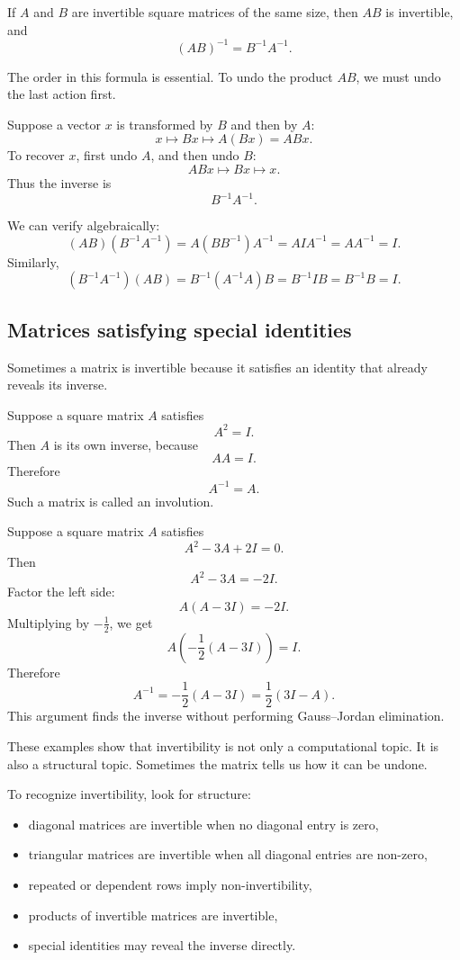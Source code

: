 \begin{theorembox}
If \(A\) and \(B\) are invertible square matrices of the same size, then \(AB\) is invertible, and
\[
(AB)^{-1}=B^{-1}A^{-1}.
\]
\end{theorembox}

The order in this formula is essential. To undo the product \(AB\), we must undo the last action first.

Suppose a vector \(x\) is transformed by \(B\) and then by \(A\):
\[
x \longmapsto Bx \longmapsto A(Bx)=ABx.
\]
To recover \(x\), first undo \(A\), and then undo \(B\):
\[
ABx \longmapsto Bx \longmapsto x.
\]
Thus the inverse is
\[
B^{-1}A^{-1}.
\]

We can verify algebraically:
\[
(AB)(B^{-1}A^{-1})=A(BB^{-1})A^{-1}=AI A^{-1}=AA^{-1}=I.
\]
Similarly,
\[
(B^{-1}A^{-1})(AB)=B^{-1}(A^{-1}A)B=B^{-1}IB=B^{-1}B=I.
\]

\subsection{Matrices satisfying special identities}

Sometimes a matrix is invertible because it satisfies an identity that already reveals its inverse.

\begin{examplebox}
Suppose a square matrix \(A\) satisfies
\[
A^2=I.
\]
Then \(A\) is its own inverse, because
\[
AA=I.
\]
Therefore
\[
A^{-1}=A.
\]
Such a matrix is called an involution.
\end{examplebox}

\begin{examplebox}
Suppose a square matrix \(A\) satisfies
\[
A^2-3A+2I=0.
\]
Then
\[
A^2-3A=-2I.
\]
Factor the left side:
\[
A(A-3I)=-2I.
\]
Multiplying by \(-\frac12\), we get
\[
A\left(-\frac12(A-3I)\right)=I.
\]
Therefore
\[
A^{-1}=-\frac12(A-3I)=\frac12(3I-A).
\]
This argument finds the inverse without performing Gauss--Jordan elimination.
\end{examplebox}

These examples show that invertibility is not only a computational topic. It is also a structural topic. Sometimes the matrix tells us how it can be undone.

\begin{summarybox}
To recognize invertibility, look for structure:
\begin{itemize}
\item diagonal matrices are invertible when no diagonal entry is zero,
\item triangular matrices are invertible when all diagonal entries are non-zero,
\item repeated or dependent rows imply non-invertibility,
\item products of invertible matrices are invertible,
\item special identities may reveal the inverse directly.
\end{itemize}
\end{summarybox}
